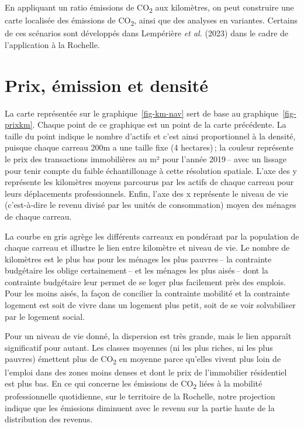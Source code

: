 \documentclass[
  9pt,
  a4paper,
  DIV=11]{scrreprt}
\begin{document}
En appliquant un ratio émissions de CO\textsubscript{2} aux kilomètres,
on peut construire une carte localisée des émissions de
CO\textsubscript{2}, ainsi que des analyses en variantes. Certains de
ces scénarios sont développés dans Lempérière \emph{et al.} (2023) dans
le cadre de l'application à la Rochelle.

\section{Prix, émission et
densité}\label{prix-uxe9mission-et-densituxe9}

La carte représentée sur le graphique~\ref{fig-km-nav} sert de base au
graphique~\ref{fig-prixkm}. Chaque point de ce graphique est un point de
la carte précédente. La taille du point indique le nombre d'actifs et
c'est ainsi proportionnel à la densité, puisque chaque carreau 200m a
une taille fixe (4 hectares)\,; la couleur représente le prix des
transactions immobilières au m² pour l'année 2019\,-- avec un lissage
pour tenir compte du faible échantillonage à cette résolution spatiale.
L'axe des y représente les kilomètres moyens parcourus par les actifs de
chaque carreau pour leurs déplacements professionnels. Enfin, l'axe des
x représente le niveau de vie (c'est-à-dire le revenu divisé par les
unités de consommation) moyen des ménages de chaque carreau.

La courbe en gris agrège les différents carreaux en pondérant par la
population de chaque carreau et illustre le lien entre kilomètre et
niveau de vie. Le nombre de kilomètres est le plus bas pour les ménages
les plus pauvres\,-- la contrainte budgétaire les oblige
certainement\,-- et les ménages les plus aisés\,-- dont la contrainte
budgétaire leur permet de se loger plus facilement près des emplois.
Pour les moins aisés, la façon de concilier la contrainte mobilité et la
contrainte logement est soit de vivre dans un logement plus petit, soit
de se voir solvabiliser par le logement social.

Pour un niveau de vie donné, la dispersion est très grande, mais le lien
apparaît significatif pour autant. Les classes moyennes (ni les plus
riches, ni les plus pauvres) émettent plus de CO\textsubscript{2} en
moyenne parce qu'elles vivent plus loin de l'emploi dans des zones moins
denses et dont le prix de l'immobilier résidentiel est plus bas. En ce
qui concerne les émissions de CO\textsubscript{2} liées à la mobilité
professionnelle quotidienne, sur le territoire de la Rochelle, notre
projection indique que les émissions diminuent avec le revenu sur la
partie haute de la distribution des revenus.
\end{document}
